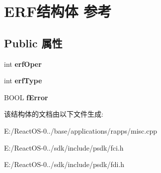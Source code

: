 \hypertarget{struct_e_r_f}{}\section{E\+R\+F结构体 参考}
\label{struct_e_r_f}
\subsection*{Public 属性}
\begin{DoxyCompactItemize}
\item 
\mbox{\label{struct_e_r_f_a325ff8beabc5394e6c89706f9c9db103}} 
int {\bfseries erf\+Oper}
\item 
\mbox{\label{struct_e_r_f_a0793cc304cb88e1885543a031ed3227d}} 
int {\bfseries erf\+Type}
\item 
\mbox{\label{struct_e_r_f_a2382392b5282d9b9b697268d4bc681e7}} 
B\+O\+OL {\bfseries f\+Error}
\end{DoxyCompactItemize}


该结构体的文档由以下文件生成\+:\begin{DoxyCompactItemize}
\item 
E\+:/\+React\+O\+S-\/0../base/applications/rapps/misc.\+cpp\item 
E\+:/\+React\+O\+S-\/0../sdk/include/psdk/fci.\+h\item 
E\+:/\+React\+O\+S-\/0../sdk/include/psdk/fdi.\+h\end{DoxyCompactItemize}

